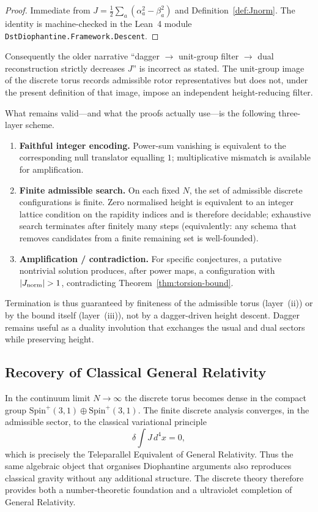 \documentclass[dvipdfmx,a4paper]{article}
\theoremstyle{definition}
\theoremstyle{remark}
\newcommand{\Jnorm}{J_{\rm norm}}
\begin{document}
\begin{proof}
Immediate from \(J=\frac12\sum_a(\alpha_a^2-\beta_a^2)\) and Definition~\ref{def:Jnorm}. The identity is machine-checked in the Lean~4 module \texttt{DstDiophantine.Framework.Descent}.
\end{proof}

Consequently the older narrative ``dagger \(\to\) unit-group filter \(\to\) dual reconstruction strictly decreases \(J\)'' is incorrect as stated. The unit-group image of the discrete torus records admissible rotor representatives but does not, under the present definition of that image, impose an independent height-reducing filter.

What remains valid---and what the proofs actually use---is the following three-layer scheme.

\begin{enumerate}[label=(\roman*)]
  \item \textbf{Faithful integer encoding.} Power-sum vanishing is equivalent to the corresponding null translator equalling \(1\); multiplicative mismatch is available for amplification.
  \item \textbf{Finite admissible search.} On each fixed \(N\), the set of admissible discrete configurations is finite. Zero normalised height is equivalent to an integer lattice condition on the rapidity indices and is therefore decidable; exhaustive search terminates after finitely many steps (equivalently: any schema that removes candidates from a finite remaining set is well-founded).
  \item \textbf{Amplification / contradiction.} For specific conjectures, a putative nontrivial solution produces, after power maps, a configuration with \(|\Jnorm|>1\), contradicting Theorem~\ref{thm:torsion-bound}.
\end{enumerate}

Termination is thus guaranteed by finiteness of the admissible torus (layer~(ii)) or by the bound itself (layer~(iii)), not by a dagger-driven height descent. Dagger remains useful as a duality involution that exchanges the usual and dual sectors while preserving height.

\subsection{Recovery of Classical General Relativity}

In the continuum limit \( N \to \infty \) the discrete torus becomes dense in the compact group \( \mathrm{Spin}^+(3,1) \oplus \mathrm{Spin}^+(3,1) \). The finite discrete analysis converges, in the admissible sector, to the classical variational principle
\[
\delta \int J \, d^4x = 0,
\]
which is precisely the Teleparallel Equivalent of General Relativity. Thus the same algebraic object that organises Diophantine arguments also reproduces classical gravity without any additional structure. The discrete theory therefore provides both a number-theoretic foundation and a ultraviolet completion of General Relativity.
\end{document}
